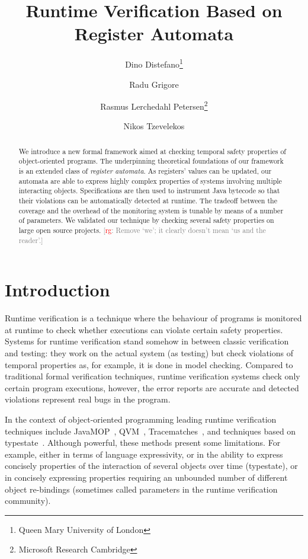 \documentclass{article} %
\title{Runtime Verification Based on Register Automata}
\author
  {     Dino Distefano\thanks{Queen Mary University of London}
  \and  Radu Grigore\footnotemark[1]
  \and  Rasmus Lerchedahl Petersen\thanks{Microsoft Research Cambridge}
  \and  Nikos Tzevelekos\footnotemark[1] }
\date{}
\newcommand{\noterg}[2]{\textcolor{gray}{[\textcolor{red}{#1}: #2]}}
\newcommand{\rg}[1]{\noterg{rg}{#1}}
\theoremstyle{definition}
\theoremstyle{remark}
\begin{document}
\maketitle
\begin{abstract} %
We introduce a new formal framework aimed at checking temporal safety properties of object-oriented programs.
The underpinning theoretical foundations of our framework is an extended class of {\em register automata}.
As registers' values can be updated, our automata are able to express highly complex properties of systems involving multiple interacting objects.
Specifications are then used to instrument Java bytecode so that their violations can be automatically detected at runtime.
The tradeoff between the coverage and the overhead of the monitoring
system is tunable by means of a number of  parameters.
We validated our technique by checking several safety properties on large open source projects.
\rg{Remove `we'; it clearly doesn't mean `us and the reader'.}
\end{abstract}

\section{Introduction} %

Runtime verification is a technique where the behaviour of programs is monitored at runtime to check whether executions
can violate certain safety properties.
Systems for runtime verification stand somehow in between classic verification and testing: they work on the actual system (as testing) but check violations of temporal properties as, for example, it is done in model checking. Compared to traditional formal verification techniques, runtime verification systems check only certain program executions, however, the error reports are accurate and detected violations represent real bugs in the program.

In the context of object-oriented programming  leading runtime verification techniques include JavaMOP~\cite{dblp:journals/sttt/meredithjgcr12}, QVM~\cite{arnold:2008}, Tracematches~\cite{dblp:conf/oopsla/allanachklmsst05}, and techniques based on typestate~\cite{strom1986,dblp:conf/oopsla/bierhoffa07,dblp:conf/oopsla/naeeml08,disney2011,ball2002}. Although powerful,  these methods present some limitations. For example, either   in terms of  language expressivity, or in the ability to express concisely properties of the interaction of several objects 
over time (typestate), or in concisely expressing  properties requiring an unbounded number of different object re-bindings (sometimes called parameters in the runtime verification community).
\end{document}
